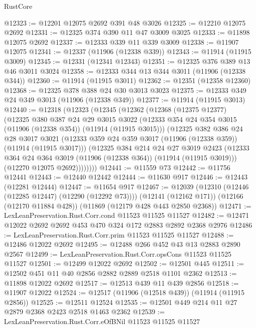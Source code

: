 \begin{lexlean}{RustCore}
\begin{coremodule}
@12323 := @12201 @12075 @2692 @391 @48 @3026
@12325 := @12210 @12075 @2692
@12331 := @12325 @374 @390 @11 @47 @3009 @3025
@12333 := @11898 @12075 @2692
@12337 := @12333 @339 @11 @339 @3009
@12338 := @11907 @12075
@12341 := @12337 (@11906 (@12338 @339))
@12343 := @11914 (@11915 @3009)
@12345 := @12331 (@12341 @12343)
@12351 := @12325 @376 @389 @13 @46 @3011 @3024
@12358 := @12333 @344 @13 @344 @3011 (@11906 (@12338 @344))
@12360 := @11914 (@11915 @3011)
@12362 := @12351 (@12358 @12360)
@12368 := @12325 @378 @388 @24 @30 @3013 @3023
@12375 := @12333 @349 @24 @349 @3013 (@11906 (@12338 @349))
@12377 := @11914 (@11915 @3013)
@12440 := @12318
    (@12323
      (@12345
        (@12362
          (@12368
            (@12375 @12377)
            (@12325
              @380
              @387
              @24
              @29
              @3015
              @3022
              (@12333 @354 @24 @354 @3015 (@11906 (@12338 @354)) (@11914 (@11915 @3015)))
              (@12325
                @382
                @386
                @24
                @28
                @3017
                @3021
                (@12333 @359 @24 @359 @3017 (@11906 (@12338 @359)) (@11914 (@11915 @3017)))
                (@12325
                  @384
                  @214
                  @24
                  @27
                  @3019
                  @2423
                  (@12333 @364 @24 @364 @3019 (@11906 (@12338 @364)) (@11914 (@11915 @3019)))
                  (@12270 @12075 @2692))))))))
@12441 := @11559 @73
@12442 := @11756 @12441
@12443 := @12440 @12442
@12444 := @11630 @917
@12446 := @12443 (@12281 @12444)
@12447 := @11654 @917
@12467 := @12039
    (@12310 (@12446 (@12285 @12447) (@12290 (@12292 @73))))
    (@12141 (@12162 @171))
    (@12166 (@12170 @11884 @428))
    (@11869 (@12179 @428 @443 @2850 @2368))
@12471 := LexLeanPreservation.Rust.Corr.cond @11523 @11525 @11527
@12482 := @12471 @12022 @2692 @2692 @453 @470 @324 @172 @2883 @2892 @2368 @2976
@12486 := LexLeanPreservation.Rust.Corr.prim @11523 @11525 @11527
@12488 := @12486 @12022 @2692
@12495 := @12488 @266 @452 @43 @13 @2883 @2890 @2567
@12499 := LexLeanPreservation.Rust.Corr.opsCons @11523 @11525 @11527
@12501 := @12499 @12022 @2692
@12502 := @12501 @445
@12511 := @12502 @451 @11 @40 @2856 @2882 @2889 @2518 @1101 @2362
@12513 := @11898 @12022 @2692
@12517 := @12513 @439 @11 @439 @2856
@12518 := @11907 @12022
@12524 := @12517 (@11906 (@12518 @439)) (@11914 (@11915 @2856))
@12525 := @12511 @12524
@12535 := @12501 @449 @214 @11 @27 @2879 @2368 @2423 @2518 @1463 @2362
@12539 := LexLeanPreservation.Rust.Corr.eOfBNil @11523 @11525 @11527

\end{coremodule}
\end{lexlean}
